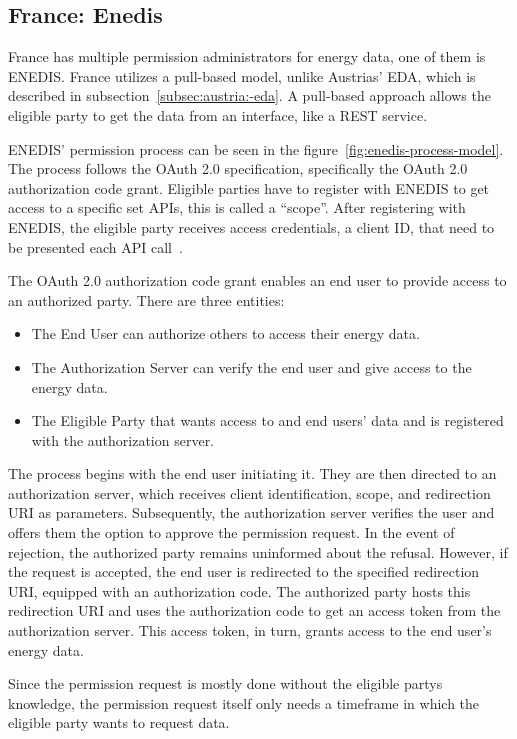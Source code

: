 \subsection{France: Enedis}\label{subsec:france:-enedis}
France has multiple permission administrators for energy data, one of them is ENEDIS.
France utilizes a pull-based model, unlike Austrias' EDA, which is described in subsection\ \ref{subsec:austria:-eda}.
A pull-based approach allows the eligible party to get the data from an interface, like a REST service.

ENEDIS' permission process can be seen in the figure\ \ref{fig:enedis-process-model}.
The process follows the OAuth 2.0 specification, specifically the OAuth 2.0 authorization code grant.
Eligible parties have to register with ENEDIS to get access to a specific set APIs, this is called a ``scope''.
After registering with ENEDIS, the eligible party receives access credentials, a client ID, that need to be presented each API call~\cite{rfc6749-oauth, enedis-dev-guide}.

The OAuth 2.0 authorization code grant enables an end user to provide access to an authorized party.
There are three entities:
\begin{itemize}
    \item{The End User} can authorize others to access their energy data.
    \item{The Authorization Server} can verify the end user and give access to the energy data.
    \item{The Eligible Party} that wants access to and end users' data and is registered with the authorization server.
\end{itemize}
The process begins with the end user initiating it.
They are then directed to an authorization server, which receives client identification, scope, and redirection URI as parameters.
Subsequently, the authorization server verifies the user and offers them the option to approve the permission request.
In the event of rejection, the authorized party remains uninformed about the refusal.
However, if the request is accepted, the end user is redirected to the specified redirection URI, equipped with an authorization code.
The authorized party hosts this redirection URI and uses the authorization code to get an access token from the authorization server.
This access token, in turn, grants access to the end user's energy data.

Since the permission request is mostly done without the eligible partys knowledge, the permission request itself only needs a timeframe in which the eligible party wants to request data.


